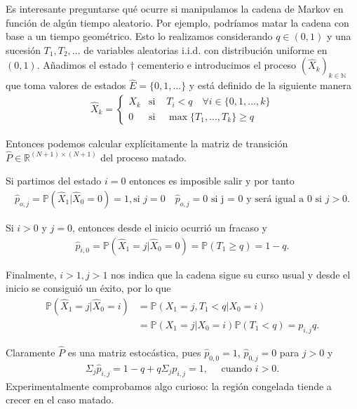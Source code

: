 \documentclass{article}
\numberwithin{equation}{section}
\begin{document}
Es interesante preguntarse qué ocurre si manipulamos la cadena de Markov en función de algún tiempo aleatorio. Por ejemplo, podríamos matar la cadena con base a un tiempo geométrico. Esto lo realizamos considerando $q \in (0,1)$ y una sucesión $T_1,T_2,...$ de variables aleatorias i.i.d. con distribución uniforme en $(0,1)$. Añadimos el estado $\dag$ cementerio e introducimos el proceso $(\widehat{X}_k)_{k \in \mathbb{N}}$ que toma valores de estados $\widehat{E} = \{0,1,...\}$ y está definido de la siguiente manera
\begin{align*}
    \widehat{X}_k = \left\{\begin{array}{ccc}
      X_k   &  \text{si } & T_i<q \quad \forall i \in \{0,1,...,k\} \\
       0  &  \text{si } & \max\{T_1,...,T_k\} \geq q
    \end{array}\right.
\end{align*}

Entonces podemos calcular explícitamente la matriz de transición $\widehat{P} \in \mathbb{R}^{(N+1)\times(N+1)}$ del proceso matado.

Si partimos del estado $i = 0$ entonces es imposible salir y por tanto 
\begin{align*}
\widehat{p}_{o,j} = \mathbb{P}(\widehat{X}_1 | \widehat{X}_0 = 0) = 1, \text{si }j=0 \quad \widehat{p}_{o,j} = 0 \text{   si j = 0 y será igual a 0 si $j>0$}.
\end{align*}

Si $i>0$ y $j = 0$, entonces desde el inicio ocurrió un fracaso y 
\begin{align*}
\widehat{p}_{i,0} =  \mathbb{P}(\widehat{X}_1 = j| \widehat{X}_0 = 0) = \mathbb{P}(T_1\geq q) = 1-q.
\end{align*}

Finalmente, $i>1, j>1$ nos indica que la cadena sigue su curso usual y desde el inicio se consiguió un éxito, por lo que
\begin{align*}
    \mathbb{P}(\widehat{X}_1 = j | \widehat{X}_0 = i) &= \mathbb{P}(X_1 = j, T_1<q | X_0 = i)\\ &= \mathbb{P}(X_1 = j | X_0 = i) \mathbb{P}(T_1<q)  = p_{i,j}q.
\end{align*}

Claramente $\widehat{P}$ es una matriz estocástica, pues $\widehat{p}_{0,0} = 1$, $\widehat{p}_{0,j} = 0$ para $j>0$ y 
\begin{align*}
    \Sigma_{j}\widehat{p}_{i,j} = 1-q + q\Sigma_jp_{i,j} = 1, \quad \text{ cuando } i>0.
\end{align*}
Experimentalmente comprobamos algo curioso: la región congelada tiende a crecer en el caso matado.
\end{document}
